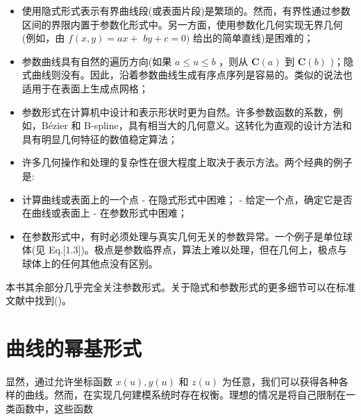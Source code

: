 \documentclass[../main.tex]{subfiles}
\begin{document}
\begin{itemize}
\item 使用隐式形式表示有界曲线段(或表面片段)是繁琐的。然而，有界性通过参数区间的界限内置于参数化形式中。另一方面，使用参数化几何实现无界几何(例如，由 \(f\left( {x,y}\right)  = {ax} +\)  \({by} + c = 0)\) 给出的简单直线)是困难的；
\end{itemize}

\begin{itemize}
\item 参数曲线具有自然的遍历方向(如果 \(a \leq  u \leq  b\) ，则从 \(\mathbf{C}\left( a\right)\) 到 \(\mathbf{C}\left( b\right)\) )；隐式曲线则没有。因此，沿着参数曲线生成有序点序列是容易的。类似的说法也适用于在表面上生成点网格；
\end{itemize}

\begin{itemize}
\item 参数形式在计算机中设计和表示形状时更为自然。许多参数函数的系数，例如，Bézier 和 B-spline，具有相当大的几何意义。这转化为直观的设计方法和具有明显几何特征的数值稳定算法；
\end{itemize}

\begin{itemize}
\item 许多几何操作和处理的复杂性在很大程度上取决于表示方法。两个经典的例子是:
\end{itemize}

\begin{itemize}
\item 计算曲线或表面上的一个点 - 在隐式形式中困难； - 给定一个点，确定它是否在曲线或表面上 - 在参数形式中困难；
\end{itemize}

\begin{itemize}
\item 在参数形式中，有时必须处理与真实几何无关的参数异常。一个例子是单位球体(见 Eq.[1.3])。极点是参数临界点，算法上难以处理，但在几何上，极点与球体上的任何其他点没有区别。
\end{itemize}

本书其余部分几乎完全关注参数形式。关于隐式和参数形式的更多细节可以在标准文献中找到(\cite{Faux81,Mort85,Hoff89,Beac91})。



\section{曲线的幂基形式}

显然，通过允许坐标函数 \(x\left( u\right) ,y\left( u\right)\) 和 \(z\left( u\right)\) 为任意，我们可以获得各种各样的曲线。然而，在实现几何建模系统时存在权衡。理想的情况是将自己限制在一类函数中，这些函数
\end{document}
